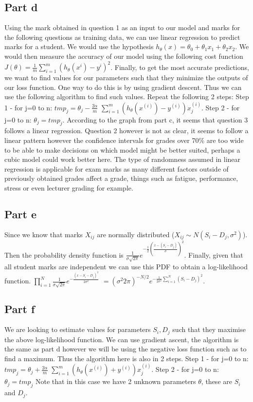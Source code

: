 \documentclass[10pt]{article}
\begin{document}
\subsection*{Part d}
Using the mark obtained in question 1 as an input to our model and marks for the following questions
as training data, we can use linear regression to predict marks for a student.
We would use the hypothesis $ h_{\theta}(x) = \theta_{0} + \theta_{1}x_{1} + \theta_{2}x_{2} $.
We would then measure the accuracy of our model using the following cost function 
$ J(\theta) = \frac{1}{m}\sum_{i = 1}^m (h_{\theta}(x^{i}) - y^{i})^2$. Finally, to get the most accurate
predictions, we want to find values for our parameters such that they minimize the outputs of our loss
function. One way to do this is by using gradient descent. Thus we can use the following algorithm to find such
values. Repeat the following 2 steps: Step 1 - for j=0 to n: $ tmp_{j} = \theta_{j} - \frac{2\alpha}{m}$
$\sum_{i = 1}^m (h_{\theta}(x^{(i)}) - y^{(i)})x_{j}^{(i)}$. Step 2 - for j=0 to n: $ \theta_{j} = tmp_{j} $.
According to the graph from part c, it seems that question 3 follows a linear regression. Question 2 however
is not as clear, it seems to follow a linear pattern however the confidence intervals for grades over 70\% are 
too wide to be able to make decisions on which model might be better suited, perhaps a cubic model could work better here.
The type of randomness assumed in linear regression is applicable for exam marks as many different factors
outside of previously obtained grades affect a grade, things such as fatigue, performance, stress or even lecturer grading for example.

\subsection*{Part e}
Since we know that marks $ X_{ij} $ are normally distributed 
($X_{ij}\sim N(S_{i} - D_{j}, \sigma^2)$). Then the probability density function is 
$ \frac{1}{\sigma\sqrt{2\pi}}e^{-\frac{1}{2}(\frac{x - (S_{i} - D_{j})}{\sigma})^2} $.
Finally, given that all student marks are independent we can use this PDF to obtain a 
log-likelihood function. $ \prod_{i = 1}^N\frac{1}{\sigma\sqrt{2\pi}} e^{-\frac{(x - S_{i} - D_{j})^2}{2\sigma^2}} $
$ = (\sigma^{2}2\pi)^{-N/2}e^{-\frac{1}{2\sigma^2}\sum_{i = 1}^N(S_{i} - D_{j})^2} $.

\subsection*{Part f}
We are looking to estimate values for parameters $S_{i}, D_{j}$ such that they maximise the above log-likelihood
function. We can use gradient ascent, the algorithm is the same as part d however we will be using
the negative loss function such as to find a maximum. Thus the algorithm here is also in 2 steps.
Step 1 - for j=0 to n: $ tmp_{j} = \theta_{j} + \frac{2\alpha}{m}$
$\sum_{i = 1}^m (h_{\theta}(x^{(i)}) + y^{(i)})x_{j}^{(i)}$. 
Step 2 - for j=0 to n: $ \theta_{j} = tmp_{j} $ 
Note that in this case we have 2 unknown parameters $ \theta $, these are $ S_{i} $ and $ D_{j} $.
\end{document}
